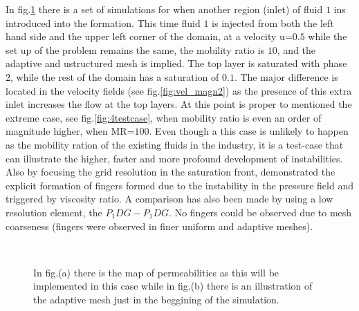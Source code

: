 \documentclass[preprint,authoryear,12pt]{elsarticle}
\begin{document}
In fig.\ref{fig:3testcase_a} there is a set of simulations for when another region (inlet) of fluid $1$ ins introduced into the formation. This time fluid $1$ is injected from both the left hand side and the upper left corner of the domain, at a velocity u=$0.5$ while the set up of the problem remains the same, the mobility ratio is $10$, and the adaptive and ustructured mesh is implied. The top layer is saturated with phase $2$, while the rest of the domain has a saturation of $0.1$. The major difference is located in the velocity fields (see fig.\ref{fig:vel_magn2}) as the presence of this extra inlet increases the flow at the top layers. At this point is proper to mentioned the extreme case, see fig.\ref{fig:4testcase}, when mobility ratio is even an order of magnitude higher, when MR=$100$. Even though a this case is unlikely to happen as the mobility ration of the existing fluids in the industry, it is a test-case that can illustrate the higher, faster and more profound development of instabilities. Also by focusing the grid resolution in the saturation front, \citet{christou2015}  demonstrated the explicit formation of ﬁngers formed due to the instability in the pressure ﬁeld and triggered by viscosity ratio. A comparison has also been made by using a low resolution element, the $P_{1}DG-P_{1}DG$. No ﬁngers could be observed due to mesh coarseness (ﬁngers were observed in ﬁner uniform and adaptive meshes).

\begin{figure}
\centering
{}\\[2mm]%
%
\caption{In fig.(a) there is the map of permeabilities as this will be implemented in this case while in fig.(b) there is an illustration of the adaptive mesh just in the beggining of the simulation.}
\label{fig:3testcase_a}
\end{figure}
\end{document}
